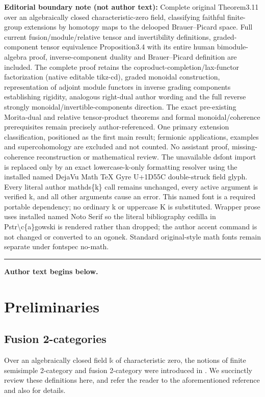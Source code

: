 \documentclass[11pt]{article}
\numberwithin{equation}{section}
\numberwithin{equation}{section}
\begin{document}
\medskip\noindent\textbf{Editorial boundary note (not author text):} Complete original Theorem3.11 over an algebraically closed characteristic-zero field, classifying faithful finite-group extensions by homotopy maps to the delooped Brauer–Picard space. Full current fusion/module/relative tensor and invertibility definitions, graded-component tensor equivalence Proposition3.4 with its entire human bimodule-algebra proof, inverse-component duality and Brauer–Picard definition are included. The complete proof retains the coproduct-completion/lax-functor factorization (native editable tikz-cd), graded monoidal construction, representation of adjoint module functors in inverse grading components establishing rigidity, analogous right-dual author wording and the full reverse strongly monoidal/invertible-components direction. The exact pre-existing Morita-dual and relative tensor-product theorems and formal monoidal/coherence prerequisites remain precisely author-referenced. One primary extension classification, positioned as the first main result; fermionic applications, examples and supercohomology are excluded and not counted. No assistant proof, missing-coherence reconstruction or mathematical review. The unavailable dsfont import is replaced only by an exact lowercase-k-only formatting resolver using the installed named DejaVu Math TeX Gyre U+1D55C double-struck field glyph. Every literal author mathds\{k\} call remains unchanged, every active argument is verified k, and all other arguments cause an error. This named font is a required portable dependency; no ordinary k or uppercase K is substituted. Wrapper prose uses installed named Noto Serif so the literal bibliography cedilla in Pstr\textbackslash{}c\{a\}gowski is rendered rather than dropped; the author accent command is not changed or converted to an ogonek. Standard original-style math fonts remain separate under fontspec no-math.\par
\medskip\hrule\medskip\noindent\textbf{Author text begins below.}\par
\setcounter{section}{1}
\section{Preliminaries}

\subsection{Fusion 2-categories}

Over an algebraically closed field $\mathds{k}$ of characteristic zero, the notions of finite semisimple 2-category and fusion 2-category were introduced in \cite{DR}. We succinctly review these definitions here, and refer the reader to the aforementioned reference and also \cite{D2} for details.
\end{document}
